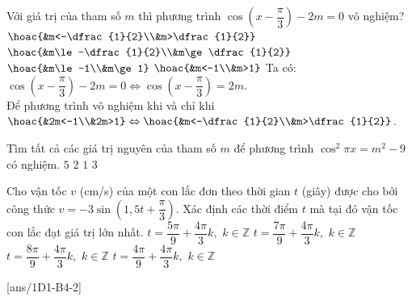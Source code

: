 \begin{ex}%
	Với giá trị của tham số $m$ thì phương trình $\cos\left(x-\dfrac{\pi}{3}\right)-2m=0$ vô nghiệm?
	\choice
	{\True $\hoac{&m<-\dfrac{1}{2}\\&m>\dfrac{1}{2}}$}
	{ $\hoac{&m\le-\dfrac{1}{2}\\&m\ge\dfrac{1}{2}}$}
	{ $\hoac{&m\le-1\\&m\ge1}$}
	{ $\hoac{&m<-1\\&m>1}$}
	\loigiai
	{Ta có: $\cos\left(x-\dfrac{\pi}{3}\right)-2m=0 \Leftrightarrow \cos\left(x-\dfrac{\pi}{3}\right)= 2m$.\\ Để phương trình vô nghiệm khi và chỉ khi $\hoac{&2m<-1\\&2m>1} \Leftrightarrow \hoac{&m<-\dfrac{1}{2}\\&m>\dfrac{1}{2}}$.
	}
\end{ex}

\begin{ex}
	Tìm tất cả các giá trị nguyên của tham số $m$ để phương trình $\cos^2 \pi x=m^2-9$ có nghiệm.
	\choice
	{$5$}
	{\True $2$}
	{$1$ }
	{$3$ }
\end{ex}

\begin{ex}
	Cho vận tốc $v$ (cm/s) của một con lắc đơn theo thời gian $t$ (giây) được cho bởi công thức $v=-3 \sin \left(1,5 t+\dfrac{\pi}{3}\right)$. Xác định các thời điểm $t$ mà tại đó vận tốc con lắc đạt giá trị lớn nhất.
	\choice
	{$t=\dfrac{5\pi}{9}+\dfrac{4 \pi}{3}k, \,\,k \in \mathbb{Z}$}
	{\True $t=\dfrac{7 \pi}{9}+\dfrac{4 \pi}{3}k, \,\,k \in \mathbb{Z}$}
	{$t=\dfrac{8\pi}{9}+\dfrac{4 \pi}{3}k, \,\,k \in \mathbb{Z}$}
	{$t=\dfrac{4\pi}{9}+\dfrac{4 \pi}{3}k, \,\,k \in \mathbb{Z}$}
\end{ex}

\TNTF
{}[ans/1D1-B4-2]


